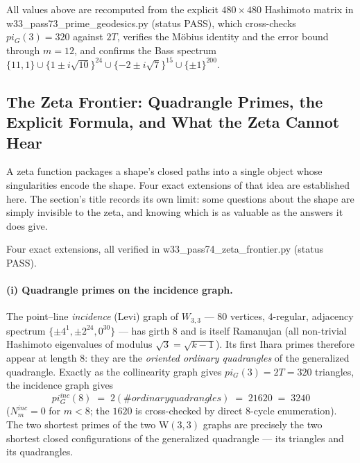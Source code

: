 \documentclass[12pt,a4paper]{article}
\def\mathrm#1{#1}%
\def\textbf#1{#1}%
\def\texttt#1{#1}%
\def\text#1{#1}%
\def\pi{pi}%
\def\cdot{ }%
\theoremstyle{definition}
\begin{document}
All values above are recomputed from the explicit $480\times480$
Hashimoto matrix in
\texttt{w33\_pass73\_prime\_geodesics.py} (status \texttt{PASS}), which
cross-checks $\pi_G(3)=320$ against $2T$, verifies the M\"obius identity
and the error bound through $m=12$, and confirms the Bass spectrum
$\{11,1\}\cup\{1\pm i\sqrt{10}\}^{24}\cup\{-2\pm i\sqrt{7}\}^{15}\cup
\{\pm1\}^{200}$.

\subsection*{The Zeta Frontier: Quadrangle Primes, the Explicit Formula,
and What the Zeta Cannot Hear}

\begin{plainbox}
A zeta function packages a shape's closed paths into a single object whose
singularities encode the shape. Four exact extensions of that idea are established here.
The section's title records its own limit: some questions about the shape are simply
invisible to the zeta, and knowing which is as valuable as the answers it does give.
\end{plainbox}


Four exact extensions, all verified in
\texttt{w33\_pass74\_zeta\_frontier.py} (status \texttt{PASS}).

\paragraph{(i) Quadrangle primes on the incidence graph.}
The point--line \emph{incidence} (Levi) graph of $W_{3,3}$ --- $80$ vertices,
$4$-regular, adjacency spectrum $\{\pm4^{1},\pm2^{24},0^{30}\}$ --- has
\textbf{girth $8$} and is itself Ramanujan (all non-trivial Hashimoto
eigenvalues of modulus $\sqrt{3}=\sqrt{k-1}$).  Its first Ihara primes
therefore appear at length $8$: they are the \emph{oriented ordinary
quadrangles} of the generalized quadrangle.  Exactly as the collinearity
graph gives $\pi_G(3)=2T=320$ triangles, the incidence graph gives
\[
\boxed{\;\pi^{\mathrm{inc}}_G(8) \;=\; 2\cdot(\#\text{ordinary quadrangles})
\;=\; 2\cdot 1620 \;=\; 3240\;}
\]
($N_m^{\mathrm{inc}}=0$ for $m<8$; the $1620$ is cross-checked by direct
$8$-cycle enumeration).  The two shortest primes of the two W\/$(3,3)$
graphs are precisely the two shortest closed configurations of the
generalized quadrangle --- its triangles and its quadrangles.
\end{document}
